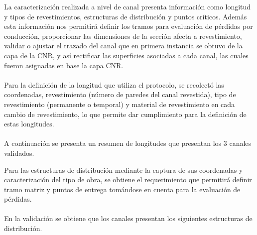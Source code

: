 \documentclass[]{article}
\begin{document}
La caracterización realizada a nivel de canal presenta información como longitud y tipos de revestimientos, estructuras de distribución y puntos críticos. Además esta información nos permitirá definir los tramos para evaluación de pérdidas por conducción, proporcionar las dimensiones de la sección afecta a revestimiento, validar o ajustar el trazado del canal que en primera instancia se obtuvo de la capa de la CNR, y así rectificar las superficies asociadas a cada canal, las cuales fueron asignadas en base la capa CNR.\\
\\ 
Para la definición de la longitud que utiliza el protocolo, se recolectó las coordenadas, revestimiento (número de paredes del canal revestida), tipo de revestimiento (permanente o temporal) y material de revestimiento en cada cambio de revestimiento, lo que permite dar cumplimiento para la definición de estas longitudes.\\
\\
A continuación se presenta un resumen de longitudes que presentan los 3 canales validados.

\begin{table}[H]
\centering
\caption{Longitudes por canal}
\label{my-label}
\end{table}

Para las estructuras de distribución mediante la captura de sus coordenadas y caracterización del tipo de obra, se obtiene el requerimiento que permitirá definir tramo matriz y puntos de entrega tomándose en cuenta para la evaluación de pérdidas. \\
\\
En la validación se obtiene que los canales presentan los siguientes estructuras de distribución.
\end{document}
